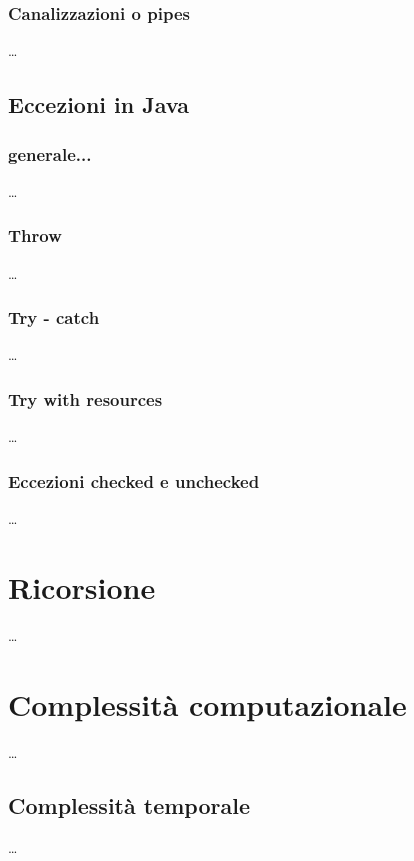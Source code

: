 \documentclass{article}
\begin{document}
\subsubsection*{Canalizzazioni o pipes}
\dots

\subsection{Eccezioni in Java}
\subsubsection*{generale...}
\dots

\subsubsection*{Throw}
\dots

\subsubsection*{Try - catch}
\dots

\subsubsection*{Try with resources}
\dots

\subsubsection*{Eccezioni checked e unchecked}
\dots

\section{Ricorsione}
\dots

\section{Complessità computazionale}
\dots

\subsection{Complessità temporale}
\dots
\end{document}

